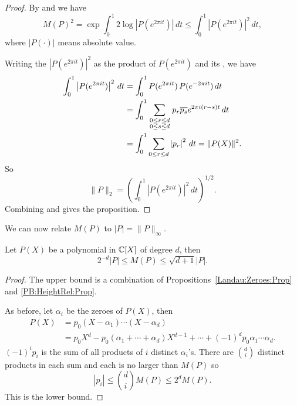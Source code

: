 \begin{proof}
By  and  we have
\begin{equation}\label{PB:Landau:Eqa}
M(P)^2 = \exp \int_0^1 2 \log|P(e^{2\pi i t})| \,dt
\le \int_0^1 |P(e^{2\pi i t})|^2 \,dt,
\end{equation}
where $|P(\cdot)|$ means absolute value.

Writing the $|P(e^{2\pi i t})|^{2}$ as the product of $P(e^{2\pi i
t})$ and its , we have
\[
\begin{aligned}
  \int_{0}^{1} \left| P(e^{2\pi i t})\right|^{2} \,dt
     & = \int_{0}^{1} P(e^{2\pi i t})\,P(e^{-2\pi i t}) \, dt\\
 & = \int_{0}^{1} 
       \sum_{\scriptstyle 0\le r \le d \atop \scriptstyle 0 \le s \le d} 
          p_{r} \overline{p_{s}} e^{2\pi i (r-s) t}
       \,dt\\
 & = \int_{0}^{1} \sum_{0 \le r \le d} \left| p_{r} \right|^{2} \, dt 
 = \| P(X) \|^{2}.
\end{aligned}
\]
So
\begin{equation} \label{PB:Landau:Eqb}
\|P\|_{2} 
 = \left( \int_{0}^{1} \left| P(e^{2\pi i t})\right|^{2} \,dt \right)^{1/2}.
\end{equation}
Combining  and  gives the 
proposition.
\end{proof}

We can now relate $M(P)$ to $|P| = \|P\|_{\infty}$.

\begin{proposition} \label{Uni:Coef:MP:Prop}
Let $P(X)$ be a polynomial in $\mathbb{C}[X]$ of degree $d$, then
\[
2^{-d} |P| \le M(P) \le \sqrt{d+1} |P|.
\]
\end{proposition}

\begin{proof}
The upper bound is a combination of Propositions~\ref{Landau:Zeroes:Prop} and
\ref{PB:HeightRel:Prop}. 

As before, let $\alpha_{i}$ be the zeroes of $P(X)$, then
\[
\begin {aligned}
P(X) & = p_0 (X - \alpha_{1}) \cdots (X - \alpha_{d}) \\
 & = p_0 X^{d} - p_0(\alpha_{1} + \cdots + \alpha_{d}) X^{d-1} + 
\cdots + (-1)^{d} p_0 \alpha_{1} \cdots \alpha_{d}.
\end{aligned}
\]
$(-1) ^{i} p_{i}$ is the sum of all products of $i$ distinct
$\alpha_{i}$'s.  There are $d \choose i$ distinct products in each sum
and each is no larger than $M(P)$ so
\begin{equation}\label{CoefZ:Bound:Eq}
\left| p_{i} \right| \le {d \choose i} M(P)
 \le 2^{d} M(P).
\end{equation}
This is the lower bound.
\end{proof}

